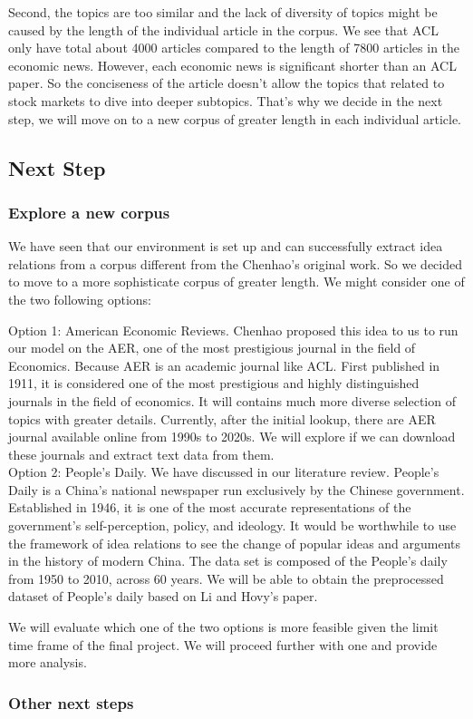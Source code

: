 \documentclass[11pt,a4paper]{article}
\begin{document}
Second, the topics are too similar and the lack of diversity of topics might be caused by the length of the individual article in the corpus. We see that ACL only have total about 4000 articles compared to the length of 7800 articles in the economic news. However, each economic news is significant shorter than an ACL paper. So the conciseness of the article doesn't allow the topics that related to stock markets to dive into deeper subtopics. That's why we decide in the next step, we will move on to a new corpus of greater length in each individual article. 

\subsection{Next Step}
\subsubsection{Explore a new corpus}
We have seen that our environment is set up and can successfully extract idea relations from a corpus different from the Chenhao's original work. So we decided to move to a more sophisticate corpus of greater length. We might consider one of the two following options: 

Option 1: American Economic Reviews. Chenhao proposed this idea to us to run our model on the AER, one of the most prestigious journal in the field of Economics. Because AER is an academic journal like ACL. First published in 1911, it is considered one of the most prestigious and highly distinguished journals in the field of economics. It will contains much more diverse selection of topics with greater details. Currently, after the initial lookup, there are AER journal available online from 1990s to 2020s. We will explore if we can download these journals and extract text data from them. \\
Option 2: People's Daily. We have discussed in our literature review. People’s Daily is a China’s national newspaper run exclusively by the Chinese government. Established in 1946, it is one of the most accurate
representations of the government’s self-perception, policy, and ideology. It would be worthwhile to use the framework of idea relations to see the change of popular ideas and arguments in the history of modern China. The data set is composed of the People’s daily from 1950 to 2010, across 60 years. We will be able to obtain the preprocessed dataset of People’s daily based on Li and Hovy’s paper. 

We will evaluate which one of the two options is more feasible given the limit time frame of the final project. We will proceed further with one and provide more analysis. 



\subsubsection{Other next steps}






\end{document}
